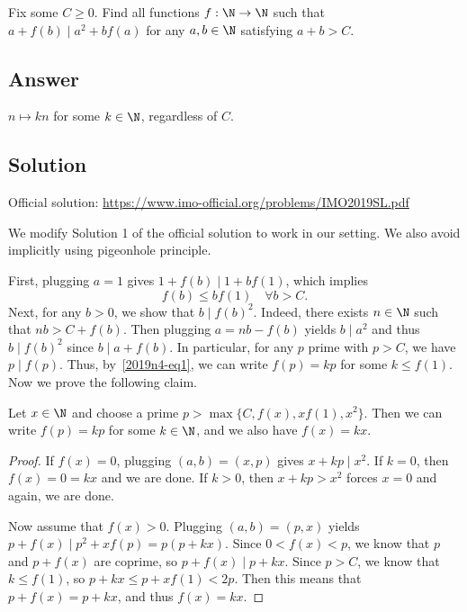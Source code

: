 Fix some $C \geq 0$.
Find all functions $f : \N \to \N$ such that $a + f(b) \mid a^2 + b f(a)$ for any $a, b \in \N$ satisfying $a + b > C$.



\subsection*{Answer}

$n \mapsto kn$ for some $k \in \N$, regardless of $C$.



\subsection*{Solution}

Official solution: \url{https://www.imo-official.org/problems/IMO2019SL.pdf}

We modify Solution 1 of the official solution to work in our setting.
We also avoid implicitly using pigeonhole principle.

First, plugging $a = 1$ gives $1 + f(b) \mid 1 + b f(1)$, which implies
\[ f(b) \leq b f(1) \quad \forall b > C. \tag{1}\label{2019n4-eq1} \]
Next, for any $b > 0$, we show that $b \mid f(b)^2$.
Indeed, there exists $n \in \N$ such that $nb > C + f(b)$.
Then plugging $a = nb - f(b)$ yields $b \mid a^2$ and thus $b \mid f(b)^2$ since $b \mid a + f(b)$.
In particular, for any $p$ prime with $p > C$, we have $p \mid f(p)$.
Thus, by~\eqref{2019n4-eq1}, we can write $f(p) = kp$ for some $k \leq f(1)$.
Now we prove the following claim.

\begin{claim}
Let $x \in \N$ and choose a prime $p > \max\{C, f(x), x f(1), x^2\}$.
Then we can write $f(p) = kp$ for some $k \in \N$, and we also have $f(x) = kx$.
\end{claim}
\begin{proof}
If $f(x) = 0$, plugging $(a, b) = (x, p)$ gives $x + kp \mid x^2$.
If $k = 0$, then $f(x) = 0 = kx$ and we are done.
If $k > 0$, then $x + kp > x^2$ forces $x = 0$ and again, we are done.

Now assume that $f(x) > 0$.
Plugging $(a, b) = (p, x)$ yields $p + f(x) \mid p^2 + x f(p) = p (p + kx)$.
Since $0 < f(x) < p$, we know that $p$ and $p + f(x)$ are coprime, so $p + f(x) \mid p + kx$.
Since $p > C$, we know that $k \leq f(1)$, so $p + kx \leq p + x f(1) < 2p$.
Then this means that $p + f(x) = p + kx$, and thus $f(x) = kx$.
\end{proof}

